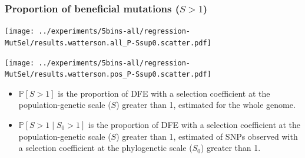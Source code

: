 \documentclass{article}
\newcommand{\proba}{\mathbb{P}}
\newcommand{\Sphy}{S_{0}}
\newcommand{\divAdv}{ \Sphy > 1}
\newcommand{\given}{\mid}
\newcommand{\Spop}{S}
\newcommand{\polyAdv}{ \Spop > 1}
\begin{document}
    \subsubsection{Proportion of beneficial mutations ($\polyAdv$)}\label{subsec:proportion-beneficial-mutations}
    \begin{minipage}{0.32\linewidth}
        \texttt{[image: ../experiments/5bins-all/regression-MutSel/results.watterson.all\_P-Ssup0.scatter.pdf]}
    \end{minipage}
    \begin{minipage}{0.32\linewidth}
        \texttt{[image: ../experiments/5bins-all/regression-MutSel/results.watterson.pos\_P-Ssup0.scatter.pdf]}
    \end{minipage}
    \begin{itemize}
        \item $ \proba [ \polyAdv ]$ is the proportion of DFE with a selection coefficient at the population-genetic scale ($\Spop$) greater than 1, estimated for the whole genome.
        \item $\proba [ \polyAdv \given \divAdv] $ is the proportion of DFE with a selection coefficient at the population-genetic scale ($\Spop$) greater than 1, estimated of SNPs observed with a selection coefficient at the phylogenetic scale ($\Sphy$) greater than 1.
    \end{itemize}

    \newpage
\end{document}
